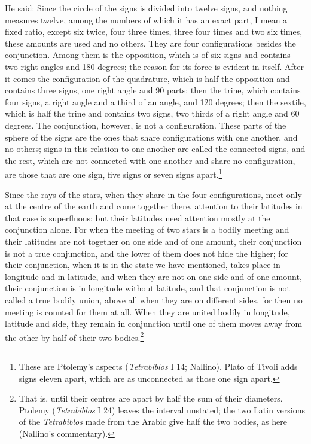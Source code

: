 \documentclass[11pt]{article}
\begin{document}
\par He said: Since the circle of the signs is divided into twelve signs, and nothing measures twelve, among the numbers of which it has an exact part, I mean a fixed ratio, except six twice, four three times, three four times and two six times, these amounts are used and no others. They are four configurations besides the conjunction. Among them is the opposition, which is of six signs and contains two right angles and 180 degrees; the reason for its force is evident in itself. After it comes the configuration of the quadrature, which is half the opposition and contains three signs, one right angle and 90 parts; then the trine, which contains four signs, a right angle and a third of an angle, and 120 degrees; then the sextile, which is half the trine and contains two signs, two thirds of a right angle and 60 degrees. The conjunction, however, is not a configuration. These parts of the sphere of the signs are the ones that share configurations with one another, and no others; signs in this relation to one another are called the connected signs, and the rest, which are not connected with one another and share no configuration, are those that are one sign, five signs or seven signs apart.\footnote{These are Ptolemy's aspects (\emph{Tetrabiblos} I 14; Nallino). Plato of Tivoli adds signs eleven apart, which are as unconnected as those one sign apart.}\par
\par Since the rays of the stars, when they share in the four configurations, meet only at the centre of the earth and come together there, attention to their latitudes in that case is superfluous; but their latitudes need attention mostly at the conjunction alone. For when the meeting of two stars is a bodily meeting and their latitudes are not together on one side and of one amount, their conjunction is not a true conjunction, and the lower of them does not hide the higher; for their conjunction, when it is in the state we have mentioned, takes place in longitude and in latitude, and when they are not on one side and of one amount, their conjunction is in longitude without latitude, and that conjunction is not called a true bodily union, above all when they are on different sides, for then no meeting is counted for them at all. When they are united bodily in longitude, latitude and side, they remain in conjunction until one of them moves away from the other by half of their two bodies.\footnote{That is, until their centres are apart by half the sum of their diameters. Ptolemy (\emph{Tetrabiblos} I 24) leaves the interval unstated; the two Latin versions of the \emph{Tetrabiblos} made from the Arabic give half the two bodies, as here (Nallino's commentary).}\par
\end{document}
